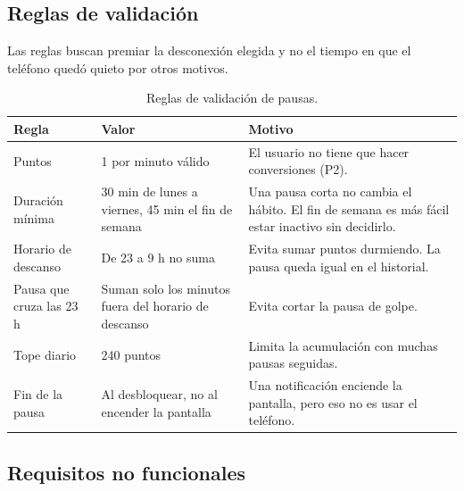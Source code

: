 \subsection{Reglas de validación}

Las reglas buscan premiar la desconexión elegida y no el tiempo en que el teléfono quedó quieto por otros motivos.

\begin{table}[H]
\centering\small
\begin{tabularx}{\textwidth}{@{}l p{4.3cm} L@{}}
\toprule
\textbf{Regla} & \textbf{Valor} & \textbf{Motivo} \\
\midrule
Puntos & 1 por minuto válido & El usuario no tiene que hacer conversiones (P2). \\
Duración mínima & 30 min de lunes a viernes, 45 min el fin de semana & Una pausa corta no cambia el hábito. El fin de semana es más fácil estar inactivo sin decidirlo. \\
Horario de descanso & De 23 a 9 h no suma & Evita sumar puntos durmiendo. La pausa queda igual en el historial. \\
Pausa que cruza las 23 h & Suman solo los minutos fuera del horario de descanso & Evita cortar la pausa de golpe. \\
Tope diario & 240 puntos & Limita la acumulación con muchas pausas seguidas. \\
Fin de la pausa & Al desbloquear, no al encender la pantalla & Una notificación enciende la pantalla, pero eso no es usar el teléfono. \\
\bottomrule
\end{tabularx}
\caption{Reglas de validación de pausas.}
\label{tab:reglas}
\end{table}

\subsection{Requisitos no funcionales}

